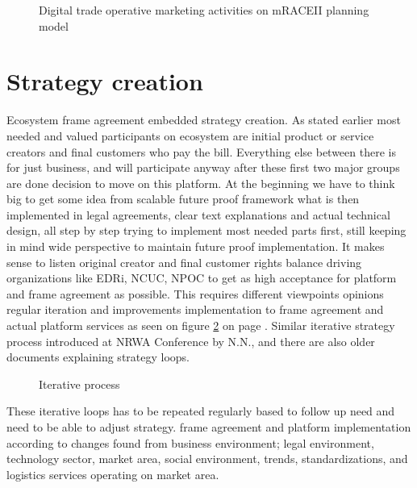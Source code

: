 \begin{figure}\begin{center}
\caption{Digital trade operative marketing activities on mRACEII planning model}
\label{fig:mRACEII}
\end{center}\end{figure}

\section{Strategy creation}
\label{strategy_creation}
Ecosystem frame agreement embedded strategy creation.
As stated earlier most needed and valued participants on ecosystem are initial
product or service creators and final customers who pay the bill. Everything
else between there is for just business, and will participate anyway after
these first two major groups are done decision to move on this platform. At
the beginning we have to think big to get some idea from scalable future proof
framework what is then implemented in legal agreements, clear text
explanations and actual technical design, all step by step trying to implement
most needed parts first, still keeping in mind wide perspective to maintain
future proof implementation. It makes sense to listen original creator and
final customer rights balance driving organizations like EDRi, NCUC, NPOC to
get as high acceptance for platform and frame agreement as possible. This
requires different viewpoints opinions regular iteration and improvements
implementation to frame agreement and actual platform services as seen on
figure \ref{fig:iteration} on page \pageref{fig:iteration}. Similar iterative
strategy process introduced at NRWA Conference by N.N.\cite{NNlostAtNRWC2022},
and there are also older documents explaining strategy loops.

\begin{figure}\begin{center}
\caption{Iterative process}
\label{fig:iteration}
\end{center}\end{figure}

These iterative loops has to be repeated regularly based to follow up need and
need to be able to adjust strategy. frame agreement and platform
implementation according to changes found from business environment; legal
environment, technology sector, market area, social environment, trends,
standardizations, and logistics services operating on market area.

